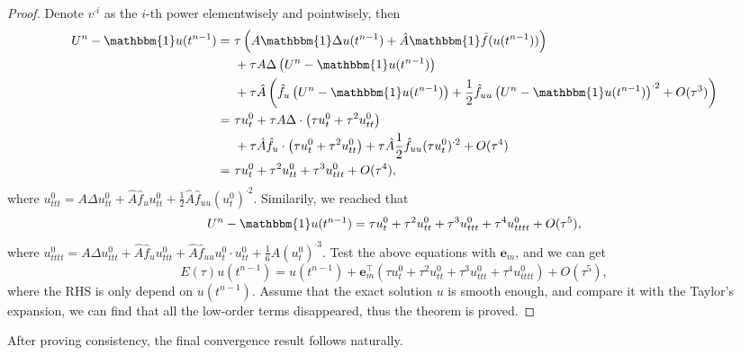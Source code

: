 \documentclass[a4paper, oneside]{book}
\def\bbone{{\mathbbm{1}}}
\def\hatA{{\hat{A}}}
\def\bfe{{\mathbf{e}}}
\def\hatf{{\hat{f}}}
\begin{document}
\begin{proof}
Denote $v^{\cdot i}$ as the $i$-th power elementwisely and pointwisely, then
\begin{equation}\label{eq:semilinear-third}
    \begin{aligned}
    U^n - \bbone u(t^{n-1}) =~& \tau \left(A  \bbone\Delta u(t^{n-1}) + \hatA \bbone \hatf(u(t^{n-1})) \right)\\
    &+ \tau A \Delta\left(U^n - \bbone u(t^{n-1})\right) \\
    &+ \tau \hatA \left(\hatf_u\left(U^n - \bbone u(t^{n-1})\right) 
     + \frac12 \hatf_{uu}\left(U^n - \bbone u(t^{n-1})\right)^{\cdot2}  + O(\tau^3)\right)\\
    =~& \tau u_t^0 + \tau A\Delta \cdot \left(\tau u_t^0 + \tau^2 u_{tt}^0\right) \\
     & + \tau \hatA \hatf_u \cdot\left(\tau u_t^0 + \tau^2 u_{tt}^0\right)
     + \tau \hatA \frac12 \hatf_{uu} (\tau u_t^0)^{\cdot 2}  + O(\tau^4)\\
    =~& \tau u_t^0 + \tau^2 u_{tt}^0+ \tau^3 u_{ttt}^0 + O(\tau^4), 
    \end{aligned}
\end{equation}
where $u_{ttt}^0 = A \Delta u_{tt}^0 + \hatA \hatf_u u_{tt}^0 + \frac12 \hatA \hatf_{uu} (u_t^0)^{\cdot 2}$. 
Similarily, we reached that 
\begin{equation}\label{eq:semilinear-fourth}
    \begin{aligned}
    U^n - \bbone u(t^{n-1}) =  \tau u_t^0 + \tau^2 u_{tt}^0+ \tau^3 u_{ttt}^0+ \tau^4 u_{tttt}^0 + O(\tau^5), 
    \end{aligned}
\end{equation}
where $u_{tttt}^0 = A \Delta u_{ttt}^0 + \hatA \hatf_u u_{ttt}^0 + \hatA \hatf_{uu} u_t^0 \cdot u_{tt}^0 + \frac16 \hatA (u_t^0)^{\cdot 3}$. 
Test the above equations with $\bfe_m$, and we can get
$$E(\tau) u(t^{n-1}) = u(t^{n-1}) + \bfe_m^\top \left(\tau u_t^0 + \tau^2 u_{tt}^0+ \tau^3 u_{ttt}^0+ \tau^4 u_{tttt}^0\right) + O(\tau^5),$$
where the RHS is only depend on $u(t^{n-1})$. 
Assume that the exact solution $u$ is smooth enough, and compare it with the Taylor's expansion, 
we can find that all the low-order terms disappeared, thus the theorem is proved. 
\end{proof}

After proving consistency, the final convergence result follows naturally. 
\end{document}
